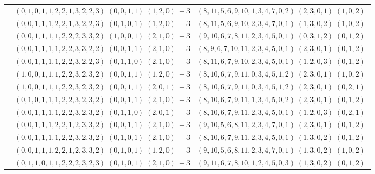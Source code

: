 \documentclass[11pt]{article}
\begin{document}
\begin{longtable}[l]{|c|c|c|}
 \cline{2-3} 
 & $(0 ,1 ,0 ,1 ,1 ,2 ,2 ,1 ,3 ,2 ,2 ,3) \;(0 ,0 ,1 ,1) \;(1 ,2 ,0) \;-3$ & $(8 ,11 ,5 ,6 ,9 ,10 ,1 ,3 ,4 ,7 ,0 ,2) \;(2 ,3 ,0 ,1) \;(1 ,0 ,2) \;$\\ 
 \cline{2-3} 
 & $(0 ,0 ,1 ,1 ,1 ,2 ,2 ,1 ,3 ,2 ,2 ,3) \;(0 ,1 ,0 ,1) \;(1 ,2 ,0) \;-3$ & $(8 ,11 ,5 ,6 ,9 ,10 ,2 ,3 ,4 ,7 ,0 ,1) \;(1 ,3 ,0 ,2) \;(1 ,0 ,2) \;$\\ 
 \cline{2-3} 
 & $(0 ,0 ,1 ,1 ,1 ,1 ,2 ,2 ,2 ,3 ,3 ,2) \;(1 ,0 ,0 ,1) \;(2 ,1 ,0) \;-3$ & $(9 ,10 ,6 ,7 ,8 ,11 ,2 ,3 ,4 ,5 ,0 ,1) \;(0 ,3 ,1 ,2) \;(0 ,1 ,2) \;$\\ 
 \cline{2-3} 
 & $(0 ,0 ,1 ,1 ,1 ,1 ,2 ,2 ,3 ,3 ,2 ,2) \;(0 ,0 ,1 ,1) \;(2 ,1 ,0) \;-3$ & $(8 ,9 ,6 ,7 ,10 ,11 ,2 ,3 ,4 ,5 ,0 ,1) \;(2 ,3 ,0 ,1) \;(0 ,1 ,2) \;$\\ 
 \cline{2-3} 
 & $(0 ,0 ,1 ,1 ,1 ,1 ,2 ,2 ,3 ,2 ,2 ,3) \;(0 ,1 ,1 ,0) \;(2 ,1 ,0) \;-3$ & $(8 ,11 ,6 ,7 ,9 ,10 ,2 ,3 ,4 ,5 ,0 ,1) \;(1 ,2 ,0 ,3) \;(0 ,1 ,2) \;$\\ 
 \cline{2-3} 
 & $(1 ,0 ,0 ,1 ,1 ,1 ,2 ,2 ,3 ,2 ,3 ,2) \;(0 ,0 ,1 ,1) \;(1 ,2 ,0) \;-3$ & $(8 ,10 ,6 ,7 ,9 ,11 ,0 ,3 ,4 ,5 ,1 ,2) \;(2 ,3 ,0 ,1) \;(1 ,0 ,2) \;$\\ 
 \cline{2-3} 
 & $(1 ,0 ,0 ,1 ,1 ,1 ,2 ,2 ,3 ,2 ,3 ,2) \;(0 ,0 ,1 ,1) \;(2 ,0 ,1) \;-3$ & $(8 ,10 ,6 ,7 ,9 ,11 ,0 ,3 ,4 ,5 ,1 ,2) \;(2 ,3 ,0 ,1) \;(0 ,2 ,1) \;$\\ 
 \cline{2-3} 
 & $(0 ,1 ,0 ,1 ,1 ,1 ,2 ,2 ,3 ,2 ,3 ,2) \;(0 ,0 ,1 ,1) \;(2 ,1 ,0) \;-3$ & $(8 ,10 ,6 ,7 ,9 ,11 ,1 ,3 ,4 ,5 ,0 ,2) \;(2 ,3 ,0 ,1) \;(0 ,1 ,2) \;$\\ 
 \cline{2-3} 
 & $(0 ,0 ,1 ,1 ,1 ,1 ,2 ,2 ,3 ,2 ,3 ,2) \;(0 ,1 ,1 ,0) \;(2 ,0 ,1) \;-3$ & $(8 ,10 ,6 ,7 ,9 ,11 ,2 ,3 ,4 ,5 ,0 ,1) \;(1 ,2 ,0 ,3) \;(0 ,2 ,1) \;$\\ 
 \cline{2-3} 
 & $(0 ,0 ,1 ,1 ,1 ,2 ,2 ,1 ,2 ,3 ,3 ,2) \;(0 ,0 ,1 ,1) \;(2 ,1 ,0) \;-3$ & $(9 ,10 ,5 ,6 ,8 ,11 ,2 ,3 ,4 ,7 ,0 ,1) \;(2 ,3 ,0 ,1) \;(0 ,1 ,2) \;$\\ 
 \cline{2-3} 
 & $(0 ,0 ,1 ,1 ,1 ,1 ,2 ,2 ,3 ,2 ,3 ,2) \;(0 ,1 ,0 ,1) \;(2 ,1 ,0) \;-3$ & $(8 ,10 ,6 ,7 ,9 ,11 ,2 ,3 ,4 ,5 ,0 ,1) \;(1 ,3 ,0 ,2) \;(0 ,1 ,2) \;$\\ 
 \cline{2-3} 
 & $(0 ,0 ,1 ,1 ,1 ,2 ,2 ,1 ,2 ,3 ,3 ,2) \;(0 ,1 ,0 ,1) \;(1 ,2 ,0) \;-3$ & $(9 ,10 ,5 ,6 ,8 ,11 ,2 ,3 ,4 ,7 ,0 ,1) \;(1 ,3 ,0 ,2) \;(1 ,0 ,2) \;$\\ 
 \cline{2-3} 
 & $(0 ,1 ,1 ,0 ,1 ,1 ,2 ,2 ,2 ,3 ,2 ,3) \;(0 ,1 ,0 ,1) \;(2 ,1 ,0) \;-3$ & $(9 ,11 ,6 ,7 ,8 ,10 ,1 ,2 ,4 ,5 ,0 ,3) \;(1 ,3 ,0 ,2) \;(0 ,1 ,2) \;$\\ 

\end{longtable}
\end{document}
